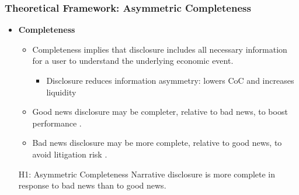 \documentclass{beamer}
\begin{document}
\begin{frame}
	\frametitle{Theoretical Framework: Asymmetric Completeness}
	\begin{itemize}
\item \textbf{Completeness}

\begin{itemize}
	\item Completeness implies that disclosure includes all necessary information for a user to understand the underlying economic event.
		\begin{itemize}
		\item Disclosure reduces information asymmetry: lowers CoC and increases liquidity \citep{diamondDisclosureLiquidityCost1991,diamondOptimalReleaseInformation1985,leuzEconomicConsequencesIncreased2000}
	\end{itemize}
	
	\item Good news disclosure may be completer, relative to bad news, to boost performance \citep{teohEarningsManagementUnderperformance1998, langVoluntaryDisclosureEquity2000}.
	\item Bad news disclosure may be more complete, relative to good news, to avoid litigation risk \citep{skinnerWhyFirmsVoluntarily1994, skinnerEarningsDisclosuresStockholder1997,marinovicNoNewsGood2016}.
\end{itemize}

\medskip
\pause
\begin{block}{H1: Asymmetric Completeness}
	Narrative disclosure is more complete in response to bad news than to good news.
\end{block}


\end{itemize}
\end{frame}
\end{document}
